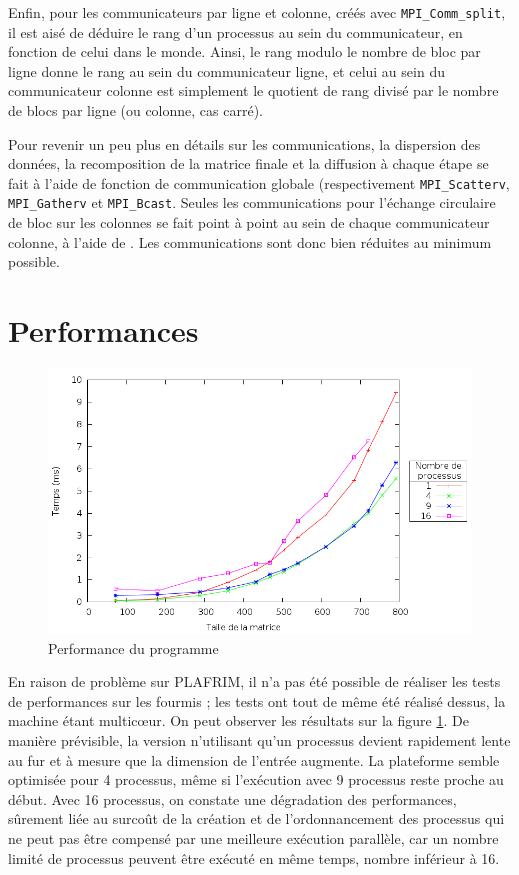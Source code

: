 \documentclass[a4paper,11pt]{article}
\begin{document}
Enfin, pour les communicateurs par ligne et colonne, créés avec \texttt{MPI_Comm_split}, il est aisé de déduire le rang d'un processus au sein du communicateur, en fonction de celui dans le monde.
Ainsi, le rang modulo le nombre de bloc par ligne donne le rang au sein du communicateur ligne, et celui au sein du communicateur colonne est simplement le quotient de rang divisé par le nombre de blocs par ligne (ou colonne, cas carré).

Pour revenir un peu plus en détails sur les communications, la dispersion des données, la recomposition de la matrice finale et la diffusion à chaque étape se fait à l'aide de fonction de communication globale (respectivement \texttt{MPI_Scatterv}, \texttt{MPI_Gatherv} et \texttt{MPI_Bcast}.
Seules les communications pour l'échange circulaire de bloc sur les colonnes se fait point à point au sein de chaque communicateur colonne, à l'aide de .
Les communications sont donc bien réduites au minimum possible.
 
\section{Performances}

\begin{figure}[h!]
  \centering
  \includegraphics[width=\textwidth]{plot.png}
  \caption{Performance du programme}
  \label{perf}
\end{figure}

En raison de problème sur PLAFRIM, il n'a pas été possible de réaliser les tests de performances sur les fourmis ; les tests ont tout de même été réalisé dessus, la machine étant multicœur. On peut observer les résultats sur la figure \ref{perf}. De manière prévisible, la version n'utilisant qu'un processus devient rapidement lente au fur et à mesure que la dimension de l'entrée augmente. La plateforme semble optimisée pour 4 processus, même si l'exécution avec 9 processus reste proche au début. Avec 16 processus, on constate une dégradation des performances, sûrement liée au surcoût de la création et de l'ordonnancement des processus qui ne peut pas être compensé par une meilleure exécution parallèle, car un nombre limité de processus peuvent être exécuté en même temps, nombre inférieur à 16.
\end{document}

